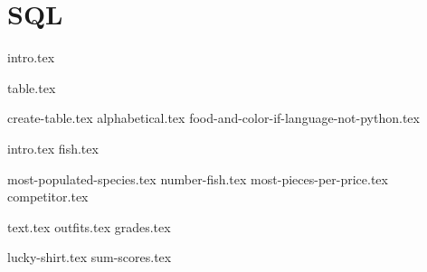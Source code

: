 \documentclass{exam}
\begin{document}
\section{SQL}
{intro.tex}
\newpage
\begin{questions}
  \question
  {table.tex}
  \begin{parts}
    {create-table.tex}
    {alphabetical.tex}
    {food-and-color-if-language-not-python.tex}
  \end{parts}
  
  \newpage
  \question 
  {intro.tex}
  {fish.tex}
  \begin{parts}
    {most-populated-species.tex}
    {number-fish.tex}
    {most-pieces-per-price.tex}
    {competitor.tex}
  \end{parts}

  \newpage
  \question
  {text.tex}
  {outfits.tex}
  {grades.tex}
  \begin{parts}
  {lucky-shirt.tex}
  {sum-scores.tex}
  \end{parts}
\end{questions}
\end{document}
